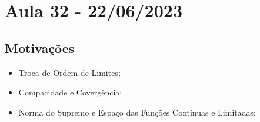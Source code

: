 \documentclass[../analysis_notes.tex]{subfiles}
\begin{document}
\section{Aula 32 - 22/06/2023}
\subsection{Motivações}
\begin{itemize}
	\item Troca de Ordem de Limites;
	\item Compacidade e Covergência;
	\item Norma do Supremo e Espaço das Funções Contínuas e Limitadas;
\end{itemize}
\end{document}
